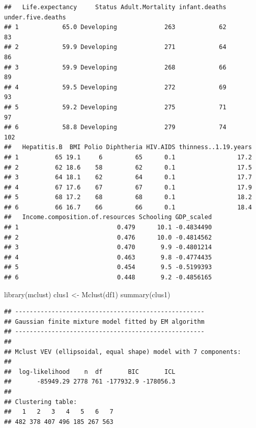\documentclass[
]{article}
\newenvironment{Shaded}{\begin{snugshade}}{\end{snugshade}}
\newcommand{\FunctionTok}[1]{\textcolor[rgb]{0.00,0.00,0.00}{#1}}
\newcommand{\NormalTok}[1]{#1}
\newcommand{\OtherTok}[1]{\textcolor[rgb]{0.56,0.35,0.01}{#1}}
\begin{document}
\begin{verbatim}
##   Life.expectancy     Status Adult.Mortality infant.deaths under.five.deaths
## 1            65.0 Developing             263            62                83
## 2            59.9 Developing             271            64                86
## 3            59.9 Developing             268            66                89
## 4            59.5 Developing             272            69                93
## 5            59.2 Developing             275            71                97
## 6            58.8 Developing             279            74               102
##   Hepatitis.B  BMI Polio Diphtheria HIV.AIDS thinness..1.19.years
## 1          65 19.1     6         65      0.1                 17.2
## 2          62 18.6    58         62      0.1                 17.5
## 3          64 18.1    62         64      0.1                 17.7
## 4          67 17.6    67         67      0.1                 17.9
## 5          68 17.2    68         68      0.1                 18.2
## 6          66 16.7    66         66      0.1                 18.4
##   Income.composition.of.resources Schooling GDP_scaled
## 1                           0.479      10.1 -0.4834490
## 2                           0.476      10.0 -0.4814562
## 3                           0.470       9.9 -0.4801214
## 4                           0.463       9.8 -0.4774435
## 5                           0.454       9.5 -0.5199393
## 6                           0.448       9.2 -0.4856165
\end{verbatim}

\begin{Shaded}
\begin{Highlighting}[]
\FunctionTok{library}\NormalTok{(mclust)}
\NormalTok{clus1 }\OtherTok{\textless{}{-}} \FunctionTok{Mclust}\NormalTok{(df1)}
\FunctionTok{summary}\NormalTok{(clus1)}
\end{Highlighting}
\end{Shaded}

\begin{verbatim}
## ---------------------------------------------------- 
## Gaussian finite mixture model fitted by EM algorithm 
## ---------------------------------------------------- 
## 
## Mclust VEV (ellipsoidal, equal shape) model with 7 components: 
## 
##  log-likelihood    n  df       BIC       ICL
##       -85949.29 2778 761 -177932.9 -178056.3
## 
## Clustering table:
##   1   2   3   4   5   6   7 
## 482 378 407 496 185 267 563
\end{verbatim}
\end{document}
